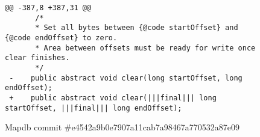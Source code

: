 \begin{figure*}
\begin{lstlisting}[moredelim={[is][\color{red}]{|||}{|||}}]
@@ -387,8 +387,31 @@ 
       /*
       * Set all bytes between {@code startOffset} and {@code endOffset} to zero.
       * Area between offsets must be ready for write once clear finishes.
       */
 -    public abstract void clear(long startOffset, long endOffset);
 +    public abstract void clear(|||final||| long startOffset, |||final||| long endOffset);
  \end{lstlisting}
\caption{Mapdb commit \#e4542a9b0e7907a11cab7a98467a770532a87e09\label{fig:final}}
\end{figure*}